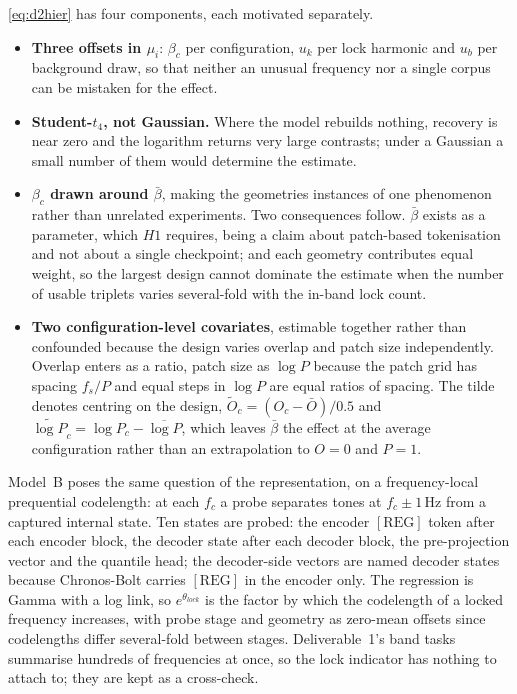 \autoref{eq:d2hier} has four components, each motivated separately.

\begin{itemize}\setlength{\itemsep}{2pt}
    \item \textbf{Three offsets in $\mu_i$}: $\beta_c$ per configuration, $u_k$ per lock harmonic and $u_b$ per background draw, so that neither an unusual frequency nor a single corpus can be mistaken for the effect.
    \item \textbf{Student-$t_4$, not Gaussian.} Where the model rebuilds nothing, recovery is near zero and the logarithm returns very large contrasts; under a Gaussian a small number of them would determine the estimate.
    \item \textbf{$\beta_c$ drawn around $\bar\beta$}, making the geometries instances of one phenomenon rather than unrelated experiments. Two consequences follow. $\bar\beta$ exists as a parameter, which $H1$ requires, being a claim about patch-based tokenisation and not about a single checkpoint; and each geometry contributes equal weight, so the largest design cannot dominate the estimate when the number of usable triplets varies several-fold with the in-band lock count.
    \item \textbf{Two configuration-level covariates}, estimable together rather than confounded because the design varies overlap and patch size independently. Overlap enters as a ratio, patch size as $\log P$ because the patch grid has spacing $f_s/P$ and equal steps in $\log P$ are equal ratios of spacing. The tilde denotes centring on the design, $\widetilde O_c=(O_c-\bar O)/0.5$ and $\widetilde{\log P}_c=\log P_c-\overline{\log P}$, which leaves $\bar\beta$ the effect at the average configuration rather than an extrapolation to $O=0$ and $P=1$.
\end{itemize}

Model~B poses the same question of the representation, on a frequency-local prequential codelength: at each $f_c$ a probe separates tones at $f_c \pm 1$\,Hz from a captured internal state. Ten states are probed: the encoder $[\mathrm{REG}]$ token after each encoder block, the decoder state after each decoder block, the pre-projection vector and the quantile head; the decoder-side vectors are named decoder states because Chronos-Bolt carries $[\mathrm{REG}]$ in the encoder only. The regression is Gamma with a log link, so $e^{\theta_{lock}}$ is the factor by which the codelength of a locked frequency increases, with probe stage and geometry as zero-mean offsets since codelengths differ several-fold between stages. Deliverable~1's band tasks summarise hundreds of frequencies at once, so the lock indicator has nothing to attach to; they are kept as a cross-check.

